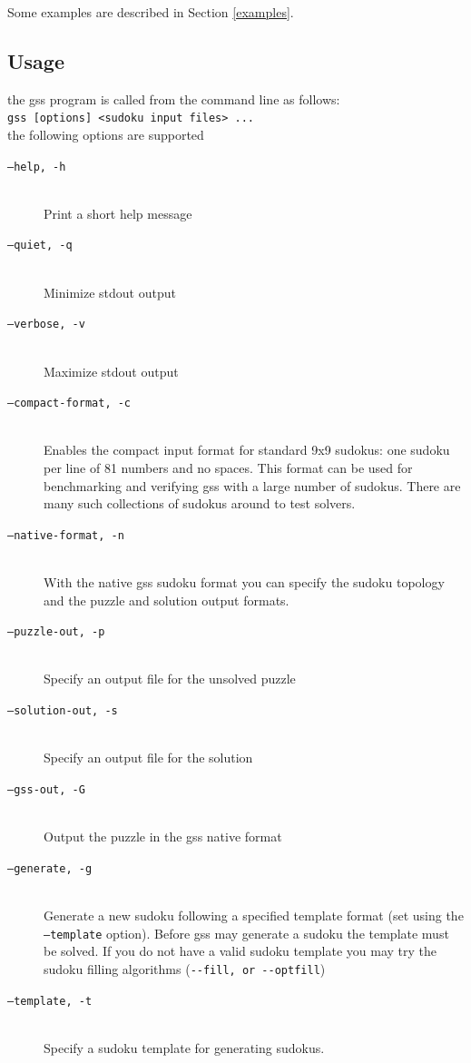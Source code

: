 \documentclass[12pt]{article}
\begin{document}
Some examples  are described in Section \ref{examples}.
\subsection{Usage}
the gss program is called from the command line as follows:\\
\verb:gss [options] <sudoku input files> ...:\\
the following options are supported
\begin{description}
\item [\texttt{--help, -h}] \hfill \\ Print a short help message
\item [\texttt{--quiet, -q}] \hfill \\ Minimize stdout output
\item [\texttt{--verbose, -v}] \hfill \\ Maximize stdout output
\item [\texttt{--compact-format, -c}] \hfill \\ Enables the compact input format for standard 9x9 sudokus: one sudoku per line of 81 numbers and no spaces. This format can be used for benchmarking and verifying gss with a large number of sudokus. There are many such collections of sudokus around to test solvers.
\item [\texttt{--native-format, -n}] \hfill \\ With the native gss sudoku format you can specify the sudoku topology and the puzzle and solution output formats.
\item [\texttt{--puzzle-out, -p}] \hfill \\ Specify an output file for the unsolved puzzle
\item [\texttt{--solution-out, -s}] \hfill \\ Specify an output file for the solution
\item [\texttt{--gss-out, -G}] \hfill \\ Output the puzzle in the gss native format 
\item [\texttt{--generate, -g}] \hfill \\ Generate a new sudoku following a specified template format (set using the \texttt{--template} option). Before gss may generate a sudoku the template 
must be solved. If you do not have a valid sudoku template you may try the sudoku filling algorithms (\verb:--fill, or --optfill:)
\item [\texttt{--template, -t}] \hfill \\ Specify a sudoku template for generating sudokus. 

\end{description}
\end{document}

